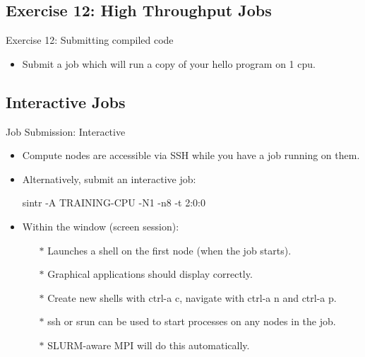 \subsection{Exercise 12: High Throughput Jobs}
\begin{frame}{Exercise 12: Submitting compiled code}
\begin{itemize}
\item{Submit a job which will run a copy of your hello program on 1 cpu.}
\end{itemize}
\end{frame}

\subsection{Interactive Jobs}
\begin{frame}[fragile]{Job Submission: Interactive}
\begin{itemize}
\item{Compute nodes are accessible via SSH \alert{while you have a job running on them}.}
\pause
\item{Alternatively, submit an interactive job:}
\begin{semiverbatim}
\alert{sintr -A TRAINING-CPU -N1 -n8 -t 2:0:0}
\end{semiverbatim}
\medskip
\pause
\item{Within the window (screen session):}
\begin{itemize}
\item[$\ast$]{Launches a shell on the first node (when the job starts).}
\item[$\ast$]{Graphical applications should display correctly.}
\item[$\ast$]{Create new shells with \alert{ctrl-a c}, navigate with \alert{ctrl-a n} and \alert{ctrl-a p}.}
\item[$\ast$]{\alert{ssh} or \alert{srun} can be used to start processes on any nodes in the job.}
\item[$\ast$]{SLURM-aware MPI will do this automatically.}
\end{itemize}
\end{itemize}
\end{frame}

